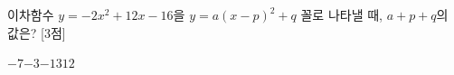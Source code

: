 이차함수 $y=-2x^2+12x-16$을 $y=a(x-p)^2+q$ 꼴로 나타낼 때, $a+p+q$의 값은?  \mbox{[3점]}
\begin{choices32}{$-7$}{$-3$}{$-1$}{$3$}{$12$}\end{choices32}
